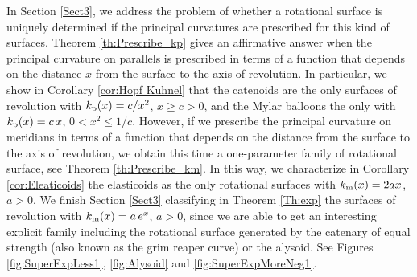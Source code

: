 \documentclass[leqno,11pt]{amsart}
\theoremstyle{definition}
\numberwithin{equation}{section}
\begin{document}
In Section \ref{Sect3}, we address the problem of whether a rotational surface is uniquely determined if the principal curvatures are prescribed for this kind of surfaces. Theorem \ref{th:Prescribe_kp} gives an affirmative answer when the principal curvature on parallels is prescribed in terms of a function that depends on the distance $x$ from the surface to the axis of revolution. In particular, we show in Corollary \ref{cor:Hopf Kuhnel} that the catenoids are the only surfaces of revolution with $k_{\text p}(x)=c/x^2$, $x \geq c>0$, and the Mylar balloons the only with  $k_{\text p}(x)=c\,x$, $0<x^2\leq1/c$. However, if we prescribe the principal curvature on meridians in terms of a function that depends on the distance from the surface to the axis of revolution, we obtain this time a one-parameter family of rotational surface, see Theorem \ref{th:Prescribe_km}. In this way, we characterize in Corollary \ref{cor:Eleaticoids} the elasticoids as the only rotational surfaces with $k_{\text m}(x)=2ax$, $a>0$. We finish Section \ref{Sect3} classifying in Theorem \ref{Th:exp} the surfaces of revolution with $k_{\text m}(x)=a\, e^x$, $a >0$, since we are able to get an interesting explicit  family including the rotational surface generated by the catenary of equal strength (also known as the grim reaper curve) or the alysoid. See Figures \ref{fig:SuperExpLess1}, \ref{fig:Alysoid} and \ref{fig:SuperExpMoreNeg1}.
\end{document}
